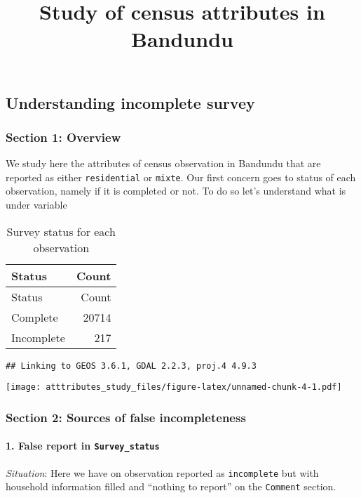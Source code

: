 \documentclass[]{article}
\title{Study of census attributes in Bandundu}
\author{}
\date{}
\let\oldparagraph\paragraph
\renewcommand{\paragraph}[1]{\oldparagraph{#1}\mbox{}}
\begin{document}
\maketitle

\subsection{Understanding incomplete
survey}\label{understanding-incomplete-survey}

\subsubsection{Section 1: Overview}\label{section-1-overview}

We study here the attributes of census observation in Bandundu that are
reported as either \texttt{residential} or \texttt{mixte}. Our first
concern goes to status of each observation, namely if it is completed or
not. To do so let's understand what is under variable

\begin{longtable}[]{@{}lr@{}}
\caption{Survey status for each observation}\tabularnewline
\toprule
Status & Count\tabularnewline
\midrule
\endfirsthead
\toprule
Status & Count\tabularnewline
\midrule
\endhead
Complete & 20714\tabularnewline
Incomplete & 217\tabularnewline
\bottomrule
\end{longtable}

\begin{verbatim}
## Linking to GEOS 3.6.1, GDAL 2.2.3, proj.4 4.9.3
\end{verbatim}

\texttt{[image: atttributes\_study\_files/figure-latex/unnamed-chunk-4-1.pdf]}

\subsubsection{Section 2: Sources of false
incompleteness}\label{section-2-sources-of-false-incompleteness}

\paragraph{\texorpdfstring{1. False report in
\texttt{Survey\_status}}{1. False report in Survey\_status}}\label{false-report-in-survey_status}

\emph{Situation}: Here we have on observation reported as
\texttt{incomplete} but with household information filled and ``nothing
to report'' on the \texttt{Comment} section.
\end{document}

